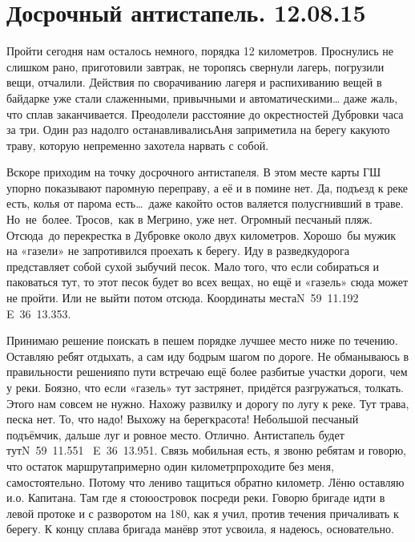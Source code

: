 \chapter{Досрочный антистапель. 12.08.15}

Пройти сегодня нам осталось немного, порядка 12 километров. Проснулись не слишком рано, приготовили завтрак, не торопясь свернули лагерь, погрузили вещи, отчалили. Действия по сворачиванию лагеря и распихиванию вещей в байдарке уже стали слаженными, привычными и автоматическими… даже жаль, что сплав заканчивается. Преодолели расстояние до окрестностей Дубровки часа за три. Один раз надолго останавливались\mdash Аня заприметила на берегу какую\sdash то траву, которую непременно захотела нарвать с собой. 

Вскоре приходим на точку досрочного антистапеля. В этом месте карты ГШ упорно показывают паромную переправу, а её и в помине нет. Да, подъезд к реке есть, колья от парома есть\ldots~даже какой\sdash то остов валяется полусгнивший в траве. Но~не~более. Тросов,~как в Мегрино, уже нет. Огромный песчаный пляж. Отсюда~до перекрестка в Дубровке около двух километров. Хорошо~бы мужик на «газели» не запротивился проехать к берегу. Иду в разведку\mdash дорога представляет собой сухой зыбучий песок. Мало того, что если собираться и паковаться тут, то этот песок будет во всех вещах, но ещё и «газель» сюда может не пройти. Или не выйти потом отсюда. Координаты места\mdash N~59\degree~11.192\textprime~ E~36\degree~13.353\textprime.

Принимаю решение поискать в пешем порядке лучшее место ниже по течению. Оставляю ребят отдыхать, а сам иду бодрым шагом по дороге. Не обманываюсь в правильности решения\mdash по пути встречаю ещё более разбитые участки дороги, чем у реки. Боязно, что если «газель» тут застрянет, придётся разгружаться, толкать. Этого нам совсем не нужно. Нахожу развилку и дорогу по лугу к реке. Тут трава, песка нет. То, что надо! Выхожу на берег\mdash красота! Небольшой песчаный подъёмчик, дальше луг и ровное место. Отлично. Антистапель будет тут\mdash N~59\degree~11.551\textprime~ E~36\degree~13.951\textprime. Связь мобильная есть, я звоню ребятам и говорю, что остаток маршрута\mdash примерно один километр\mdash проходите без меня, самостоятельно. Потому что лениво тащиться обратно километр. Лёню оставляю и.о. Капитана. Там где я стою\mdash островок посреди реки. Говорю бригаде идти в левой протоке и с разворотом на 180\degree, как я учил, против течения причаливать к берегу. К концу сплава бригада манёвр этот усвоила, я надеюсь, основательно. 

